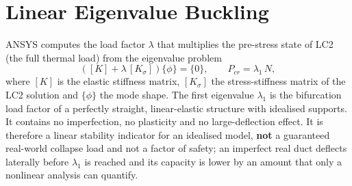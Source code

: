 \section{Linear Eigenvalue Buckling}
ANSYS computes the load factor $\lambda$ that multiplies the pre-stress state of LC2 (the full thermal load) from the eigenvalue problem
\begin{equation}
\left([K] + \lambda\,[K_\sigma]\right)\{\phi\} = \{0\}, \qquad P_{cr} = \lambda_1\,N ,
\label{eq:eigen}
\end{equation}
where $[K]$ is the elastic stiffness matrix, $[K_\sigma]$ the stress-stiffness matrix of the LC2 solution and $\{\phi\}$ the mode shape. The
first eigenvalue $\lambda_1$ is the bifurcation load factor of a perfectly straight, linear-elastic structure with idealised supports. It
contains no imperfection, no plasticity and no large-deflection effect. It is therefore a linear stability indicator for an idealised
model, \textbf{not} a guaranteed real-world collapse load and not a factor of safety; an imperfect real duct deflects laterally before
$\lambda_1$ is reached and its capacity is lower by an amount that only a nonlinear analysis can quantify.
